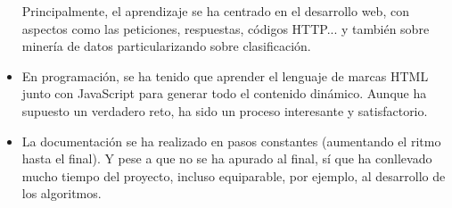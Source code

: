 \begin{itemize}
    Principalmente, el aprendizaje se ha centrado en el desarrollo web, con
    aspectos como las peticiones, respuestas, códigos HTTP... y también sobre
    minería de datos particularizando sobre clasificación.
    \item En programación, se ha tenido que aprender el lenguaje de marcas HTML junto
    con JavaScript para generar todo el contenido dinámico. Aunque ha supuesto
    un verdadero reto, ha sido un proceso interesante y satisfactorio.
    \item La documentación se ha realizado en pasos constantes (aumentando el
    ritmo hasta el final). Y pese a que no se ha apurado al final, sí que ha
    conllevado mucho tiempo del proyecto, incluso equiparable, por ejemplo, al
    desarrollo de los algoritmos.
\end{itemize}